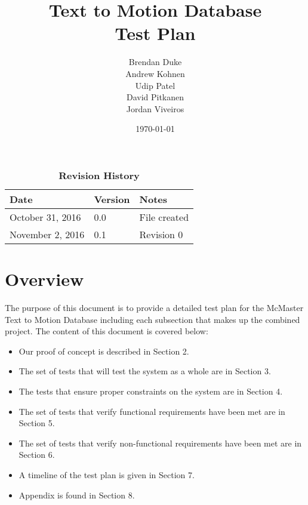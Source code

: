 \documentclass{scrreprt}
\begin{document}
\title{\bf Text to Motion Database\\[\baselineskip]\Large Test Plan}
\author{Brendan Duke\\Andrew Kohnen\\Udip Patel\\David Pitkanen\\Jordan Viveiros}
\date{\today}
	
\maketitle

\tableofcontents


\begin{table}[bp]
\caption*{\bf Revision History}
\begin{tabularx}{\textwidth}{p{3.5cm}p{2cm}X}
\toprule {\bf Date} & {\bf Version} & {\bf Notes}\\
\midrule
October 31, 2016 & 0.0 & File created\\
November 2, 2016 & 0.1 & Revision 0\\
\bottomrule
\end{tabularx}
\end{table}

\newpage


\chapter{Overview}
The purpose of this document is to provide a detailed test plan for the McMaster Text to Motion Database including each subsection that makes up the combined project. The content of this document is covered below:

\begin{itemize}
  \item Our proof of concept is described in Section 2.
  \item The set of tests that will test the system as a whole are in Section 3.
  \item The tests that ensure proper constraints on the system are in Section 4.
  \item The set of tests that verify functional requirements have been met are in Section 5.
  \item The set of tests that verify non-functional requirements have been met are in Section 6.
  \item A timeline of the test plan is given in Section 7.
  \item Appendix is found in Section 8.
\end{itemize} 
\end{document}
